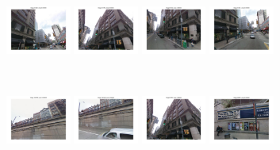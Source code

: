         \begin{minipage}{0.75\linewidth}
            \begin{minipage}{\linewidth} 
                \colorbox{myRed}{\includegraphics[trim = 35mm 30mm 35mm 30mm, clip=true, height=16mm]{imgs/Pval/exMix19/mixPval01.jpg}}
                \colorbox{myGreen}{\includegraphics[trim = 35mm 30mm 35mm 30mm, clip=true, height=16mm]{imgs/Pval/exMix19/mixPval02.jpg}}
                \colorbox{myGreen}{\includegraphics[trim = 35mm 30mm 35mm 30mm, clip=true, height=16mm]{imgs/Pval/exMix19/mixPval03.jpg}}
                \colorbox{myGreen}{\includegraphics[trim = 35mm 30mm 35mm 30mm, clip=true, height=16mm]{imgs/Pval/exMix19/mixPval04.jpg}}
            \end{minipage}
            \\
            \begin{minipage}{\linewidth}
                \colorbox{myRed}{\includegraphics[trim = 35mm 30mm 35mm 30mm, clip=true, height=16mm]{imgs/Pval/exMix19/mix01.jpg}}
                \colorbox{myRed}{\includegraphics[trim = 35mm 30mm 35mm 30mm, clip=true, height=16mm]{imgs/Pval/exMix19/mix02.jpg}}
                \colorbox{myGreen}{\includegraphics[trim = 35mm 30mm 35mm 30mm, clip=true, height=16mm]{imgs/Pval/exMix19/mix03.jpg}}
                \colorbox{myRed}{\includegraphics[trim = 35mm 30mm 35mm 30mm, clip=true, height=16mm]{imgs/Pval/exMix19/mix04.jpg}}
            \end{minipage} 
        \end{minipage}
